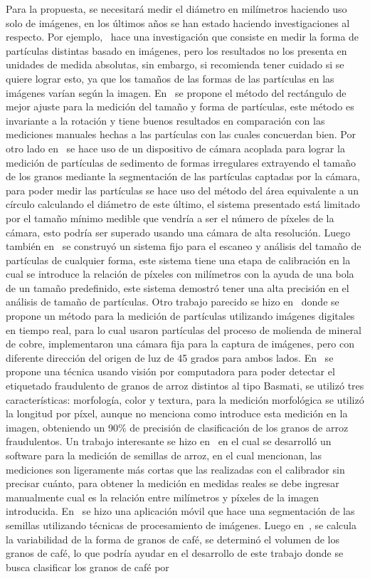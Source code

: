 \documentclass[12pt,a4paper,oneside]{book}
\begin{document}
Para la propuesta, se necesitará medir el diámetro en milímetros haciendo uso solo de imágenes, en los últimos años se han estado haciendo investigaciones al respecto. Por ejemplo,~\cite{Carter2005} hace una investigación que consiste en medir la forma de partículas distintas basado en imágenes, pero los resultados no los presenta en unidades de medida absolutas, sin embargo, si recomienda tener cuidado si se quiere lograr esto, ya que los tamaños de las formas de las partículas en las imágenes varían según la imagen. En~\cite{Wang2006} se propone el método del rectángulo de mejor ajuste para la medición del tamaño y forma de partículas, este método es invariante a la rotación y tiene buenos resultados en comparación con las mediciones manuales hechas a las partículas con las cuales concuerdan bien. Por otro lado en~\cite{Hong2013} se hace uso de un dispositivo de cámara acoplada para lograr la medición de partículas de sedimento de formas irregulares extrayendo el tamaño de los granos mediante la segmentación de las partículas captadas por la cámara, para poder medir las  partículas se hace uso del método del área equivalente a un círculo calculando el diámetro de este último, el sistema presentado está limitado por el tamaño mínimo medible que vendría a ser el número de píxeles de la cámara, esto podría ser superado usando una cámara de alta resolución. Luego también en~\cite{Liao2010} se construyó un sistema fijo para el escaneo y análisis del tamaño de partículas de cualquier forma, este sistema tiene una etapa de calibración en la cual se introduce la relación de píxeles con milímetros con la ayuda de una bola de un tamaño predefinido, este sistema demostró tener una alta precisión en el análisis de tamaño de partículas. Otro trabajo parecido se hizo en~\cite{Budzan2018} donde se propone un método para la medición de partículas utilizando imágenes digitales en tiempo real, para lo cual usaron partículas del proceso de molienda de mineral de cobre, implementaron una cámara fija para la captura de imágenes, pero con diferente dirección del origen de luz de 45 grados para ambos lados. En~\cite{Ali2017} se propone una técnica usando visión por computadora para poder detectar el etiquetado fraudulento de granos de arroz distintos al tipo Basmati, se utilizó tres características: morfología, color y textura, para la medición morfológica se utilizó la longitud por píxel, aunque no menciona como introduce esta medición en la imagen, obteniendo un 90\% de precisión de clasificación de los granos de arroz fraudulentos. Un trabajo interesante se hizo en~\cite{Tanabata2012} en el cual se desarrolló un software para la medición de semillas de arroz, en el cual mencionan, las mediciones son ligeramente más cortas que las realizadas con el calibrador sin precisar cuánto, para obtener la medición en medidas reales se debe ingresar manualmente cual es la relación entre milímetros y píxeles de la imagen introducida. En~\cite{Gao2017} se hizo una aplicación móvil que hace una segmentación de las semillas utilizando técnicas de procesamiento de imágenes. Luego en~\cite{Severa2012}, se calcula la variabilidad de la forma de granos de café, se determinó el volumen de los granos de café, lo que podría ayudar en el desarrollo de este trabajo donde se busca clasificar los granos de café por 
\end{document}

